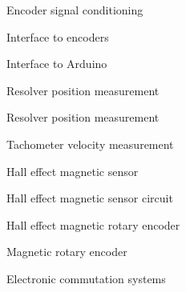\documentclass[compress]{beamer}
\begin{document}
{
    \begin{frame}{Encoder signal conditioning}
    \end{frame}
}

{
    \begin{frame}{Interface to encoders}
    \end{frame}
}

{
    \begin{frame}{Interface to Arduino}
    \end{frame}
}

{
    \begin{frame}{Resolver position measurement}
    \end{frame}
}

{
    \begin{frame}{Resolver position measurement}
    \end{frame}
}

{
    \begin{frame}{Tachometer velocity measurement}
    \end{frame}
}

{
    \begin{frame}{Hall effect magnetic sensor}
    \end{frame}
}

{
    \begin{frame}{Hall effect magnetic sensor circuit}
    \end{frame}
}

{
    \begin{frame}{Hall effect magnetic rotary encoder}
    \end{frame}
}

{
    \begin{frame}{Magnetic rotary encoder}
    \end{frame}
}

{
    \begin{frame}{Electronic commutation systems}
    \end{frame}
}
\end{document}
